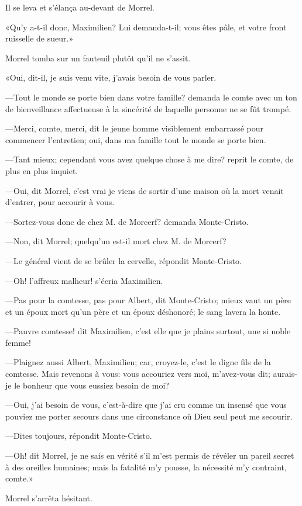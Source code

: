 Il se leva et s'élança au-devant de Morrel. 

«Qu'y a-t-il donc, Maximilien? Lui demanda-t-il; vous êtes pâle, et votre front ruisselle de sueur.» 

Morrel tomba sur un fauteuil plutôt qu'il ne s'assit. 

«Oui, dit-il, je suis venu vite, j'avais besoin de vous parler. 

—Tout le monde se porte bien dans votre famille? demanda le comte avec un ton de bienveillance affectueuse à la sincérité de laquelle personne ne se fût trompé. 

—Merci, comte, merci, dit le jeune homme visiblement embarrassé pour commencer l'entretien; oui, dans ma famille tout le monde se porte bien. 

—Tant mieux; cependant vous avez quelque chose à me dire? reprit le comte, de plus en plus inquiet. 

—Oui, dit Morrel, c'est vrai je viens de sortir d'une maison où la mort venait d'entrer, pour accourir à vous. 

—Sortez-vous donc de chez M. de Morcerf? demanda Monte-Cristo. 

—Non, dit Morrel; quelqu'un est-il mort chez M. de Morcerf? 

—Le général vient de se brûler la cervelle, répondit Monte-Cristo. 

—Oh! l'affreux malheur! s'écria Maximilien. 

—Pas pour la comtesse, pas pour Albert, dit Monte-Cristo; mieux vaut un père et un époux mort qu'un père et un époux déshonoré; le sang lavera la honte. 

—Pauvre comtesse! dit Maximilien, c'est elle que je plains surtout, une si noble femme! 

—Plaignez aussi Albert, Maximilien; car, croyez-le, c'est le digne fils de la comtesse. Mais revenons à vous: vous accouriez vers moi, m'avez-vous dit; aurais-je le bonheur que vous eussiez besoin de moi? 

—Oui, j'ai besoin de vous, c'est-à-dire que j'ai cru comme un insensé que vous pouviez me porter secours dans une circonstance où Dieu seul peut me secourir. 

—Dites toujours, répondit Monte-Cristo. 

—Oh! dit Morrel, je ne sais en vérité s'il m'est permis de révéler un pareil secret à des oreilles humaines; mais la fatalité m'y pousse, la nécessité m'y contraint, comte.» 

Morrel s'arrêta hésitant. 


